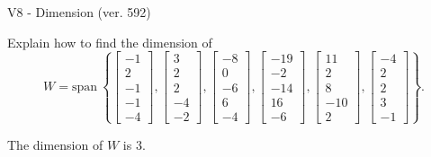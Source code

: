 \begin{exercise}
  \begin{exerciseTitle}V8 - Dimension (ver. 592)\end{exerciseTitle}
  \begin{exerciseStatement}
    Explain how to find the dimension of 
\[W=\mathrm{span}\ \left\{\left[\begin{array}{r}
-1 \\
2 \\
-1 \\
-1 \\
-4
\end{array}\right] , \left[\begin{array}{r}
3 \\
2 \\
2 \\
-4 \\
-2
\end{array}\right] , \left[\begin{array}{r}
-8 \\
0 \\
-6 \\
6 \\
-4
\end{array}\right] , \left[\begin{array}{r}
-19 \\
-2 \\
-14 \\
16 \\
-6
\end{array}\right] , \left[\begin{array}{r}
11 \\
2 \\
8 \\
-10 \\
2
\end{array}\right] , \left[\begin{array}{r}
-4 \\
2 \\
2 \\
3 \\
-1
\end{array}\right]\right\}.\]



  \end{exerciseStatement}
  \begin{exerciseAnswer}
   The dimension of \(W\) is  \(3\).
  


  \end{exerciseAnswer}
\end{exercise}